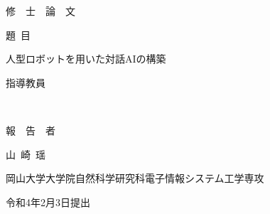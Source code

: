\pagestyle{empty}

\begin{titlepage}

\vspace*{1cm}

\begin{center}


修\ \ 士\ \ 論\ \ 文

\vspace*{0.8cm}

題\ 目

\vspace*{1cm}

{\large{人型ロボットを用いた対話AIの構築}}

\vspace*{-0.3cm}

\underline{\hspace*{12cm}}

\vspace*{3cm}

指導教員

\vspace*{0.3cm}

{\large{~}}

\vspace*{-0.3cm}

\underline{\hspace*{4cm}}

\vspace*{3cm}

報~~告~~者

\vspace*{0.3cm}

{\large{山~崎~瑶}}

\vspace*{-0.3cm}

\underline{\hspace*{4cm}}

\vspace*{0.5cm}

岡山大学大学院自然科学研究科電子情報システム工学専攻

\vspace*{2cm}

令和4年2月3日提出





\end{center}
\end{titlepage}
\newpage
